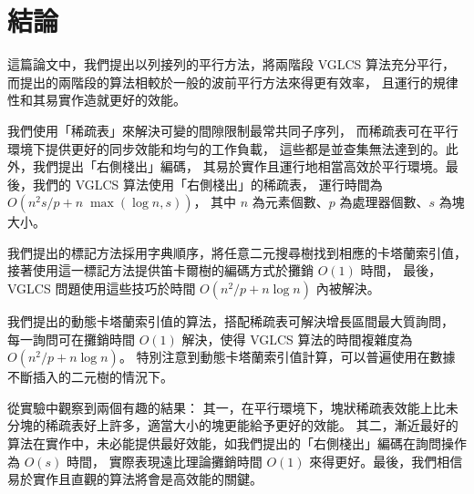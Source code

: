 \section{結論}
\label{sec:Conclusion}

這篇論文中，我們提出以列接列的平行方法，將兩階段 VGLCS 算法充分平行，
而提出的兩階段的算法相較於一般的波前平行方法來得更有效率，
且運行的規律性和其易實作造就更好的效能。

我們使用「稀疏表」來解決可變的間隙限制最常共同子序列，
而稀疏表可在平行環境下提供更好的同步效能和均勻的工作負載，
這些都是並查集無法達到的。此外，我們提出「右側棧出」編碼，
其易於實作且運行地相當高效於平行環境。最後，我們的 VGLCS 算法使用「右側棧出」的稀疏表，
運行時間為 $O(n^2 s / p + n \; \max(\log n, s))$，
其中 $n$ 為元素個數、$p$ 為處理器個數、$s$ 為塊大小。

我們提出的標記方法採用字典順序，將任意二元搜尋樹找到相應的卡塔蘭索引值，
接著使用這一標記方法提供笛卡爾樹的編碼方式於攤銷 $O(1)$ 時間，
最後，VGLCS 問題使用這些技巧於時間 $O(n^2 / p + n \log n)$ 內被解決。

我們提出的動態卡塔蘭索引值的算法，搭配稀疏表可解決增長區間最大質詢問，
每一詢問可在攤銷時間 $O(1)$ 解決，使得 VGLCS 算法的時間複雜度為 $O(n^2 / p + n \log n)$。
特別注意到動態卡塔蘭索引值計算，可以普遍使用在數據不斷插入的二元樹的情況下。

從實驗中觀察到兩個有趣的結果：
其一，在平行環境下，塊狀稀疏表效能上比未分塊的稀疏表好上許多，適當大小的塊更能給予更好的效能。
其二，漸近最好的算法在實作中，未必能提供最好效能，如我們提出的「右側棧出」編碼在詢問操作為 $O(s)$ 時間，
實際表現遠比理論攤銷時間 $O(1)$ 來得更好。最後，我們相信易於實作且直觀的算法將會是高效能的關鍵。